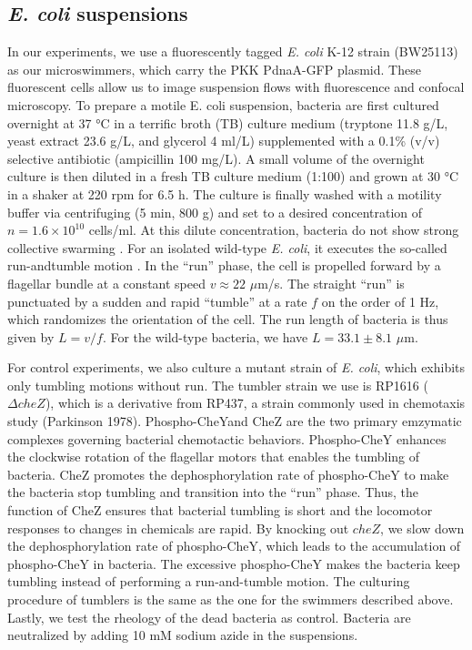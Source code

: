 \subsection{\textit{E. coli} suspensions}
In our experiments, we use a fluorescently tagged \textit{E. coli} K-12 strain (BW25113) as our microswimmers, which carry the
PKK PdnaA-GFP plasmid. These fluorescent cells allow us to image suspension flows with fluorescence and confocal microscopy. To prepare a motile E. coli suspension, bacteria are first cultured overnight at 37 °C in a terrific broth (TB) culture medium (tryptone 11.8 g/L, yeast extract 23.6 g/L, and glycerol 4 ml/L) supplemented with a 0.1\% (v/v) selective antibiotic (ampicillin 100 mg/L). A small volume of the overnight culture is then diluted in a fresh TB culture medium (1:100) and grown at 30 °C in a shaker at 220 rpm for 6.5 h. The culture is finally washed with a motility buffer via centrifuging (5 min, 800 g) and set to a desired concentration of $n = 1.6 \times 10^{10}$ cells/ml. At this dilute concentration, bacteria do not show strong collective swarming \cite{Guo2018}. For an isolated wild-type \textit{E. coli}, it executes the so-called run-andtumble motion \cite{Berg2004}. In the ``run'' phase, the cell is propelled forward by a flagellar bundle at a constant speed $v \approx 22$ $\mu$m/s. The straight ``run'' is punctuated by a sudden and rapid ``tumble'' at a rate $f$ on the order of 1 Hz, which randomizes the orientation of the cell. The run length of bacteria
is thus given by $L = v/f$. For the wild-type bacteria, we have $L = 33.1 \pm 8.1$ $\mu$m.

For control experiments, we also culture a mutant strain of \textit{E. coli}, which exhibits only tumbling motions without run. The tumbler strain we use is RP1616 ($\Delta cheZ$), which is a derivative from RP437, a strain commonly used in chemotaxis study \cite{Parkinson1978} (Parkinson 1978). Phospho-CheYand CheZ are the two primary emzymatic complexes governing bacterial chemotactic behaviors. Phospho-CheY enhances the clockwise rotation of the flagellar motors that enables the tumbling of bacteria. CheZ promotes the dephosphorylation rate of phospho-CheY to make the bacteria stop tumbling and transition into the ``run'' phase. Thus, the function of CheZ ensures that bacterial tumbling is short and the locomotor responses to changes in chemicals are rapid. By knocking out $cheZ$, we slow down the dephosphorylation rate of phospho-CheY, which leads to the accumulation of phospho-CheY in bacteria. The excessive phospho-CheY makes the bacteria keep tumbling instead of performing a run-and-tumble motion. The culturing procedure of tumblers is the same as the one for the swimmers described above. Lastly, we test the rheology of the dead bacteria as control. Bacteria are neutralized by adding 10 mM sodium azide in the suspensions.

